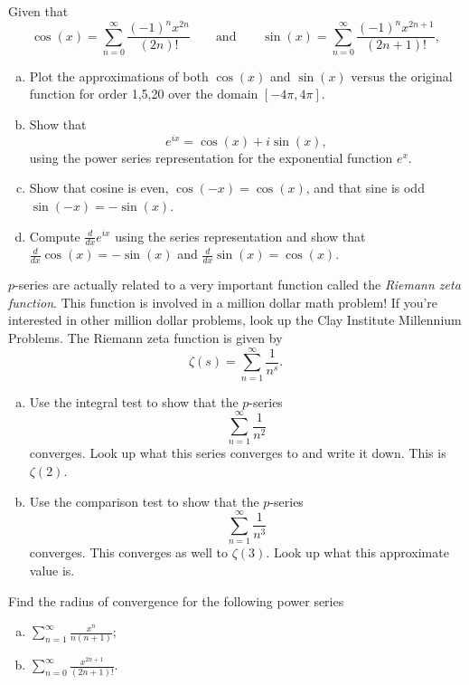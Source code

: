 \begin{problem}
	Given that
	\[
	\cos(x) = \sum_{n=0}^\infty \frac{(-1)^n x^{2n}}{(2n)!} \qquad \textrm{and} \qquad \sin(x) = \sum_{n=0}^\infty \frac{(-1)^n x^{2n+1}}{(2n+1)!},
	\]
	\begin{enumerate}[(a)]
		\item Plot the approximations of both $\cos(x)$ and $\sin(x)$ versus the original function for order 1,5,20 over the domain $[-4\pi,4\pi]$.
\item Show that
\[
e^{ix} = \cos(x) + i \sin(x),
\]
using the power series representation for the exponential function $e^x$.
\item Show that cosine is even, $\cos(-x)=\cos(x)$, and that sine is odd $\sin(-x)=-\sin(x)$.
\item Compute $\frac{d}{dx} e^{ix}$ using the series representation and show that $\frac{d}{dx}\cos(x)=-\sin(x)$ and $\frac{d}{dx}\sin(x)=\cos(x)$.
	\end{enumerate}

\end{problem}

\begin{problem} $p$-series are actually related to a very important function called the \emph{Riemann zeta function}.  This function is involved in a million dollar math problem! If you're interested in other million dollar problems, look up the Clay Institute Millennium Problems. The Riemann zeta function is given by
\[
\zeta (s) = \sum_{n=1}^\infty \frac{1}{n^s}.
\]
\begin{enumerate}[(a)]
    \item Use the integral test to show that the $p$-series
    \[
    \sum_{n=1}^\infty \frac{1}{n^2}
    \]
    converges.  Look up what this series converges to and write it down. This is $\zeta(2)$.
    \item Use the comparison test to show that the $p$-series
    \[
    \sum_{n=1}^\infty \frac{1}{n^3}
    \]
    converges. This converges as well to $\zeta(3)$. Look up what this approximate value is.
\end{enumerate}
\end{problem}

\begin{problem}
Find the radius of convergence for the following power series
\begin{enumerate}[(a)]
    \item $\displaystyle{\sum_{n=1}^\infty \frac{x^n}{n(n+1)}}$;
    \item $\displaystyle{\sum_{n=0}^\infty \frac{x^{2n+1}}{(2n+1)!}}$.
\end{enumerate}
\end{problem}


